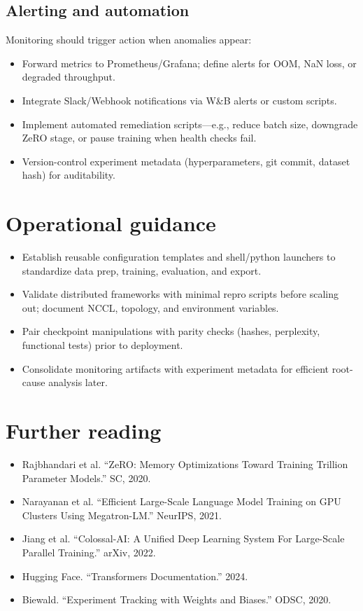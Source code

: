 \documentclass{article}
\begin{document}
\subsection{Alerting and automation}
Monitoring should trigger action when anomalies appear:
\begin{itemize}
  \item Forward metrics to Prometheus/Grafana; define alerts for OOM, NaN loss, or degraded throughput.
  \item Integrate Slack/Webhook notifications via W\&B alerts or custom scripts.
  \item Implement automated remediation scripts—e.g., reduce batch size, downgrade ZeRO stage, or pause training when health checks fail.
  \item Version-control experiment metadata (hyperparameters, git commit, dataset hash) for auditability.
\end{itemize}

\section*{Operational guidance}
\begin{itemize}
  \item Establish reusable configuration templates and shell/python launchers to standardize data prep, training, evaluation, and export.
  \item Validate distributed frameworks with minimal repro scripts before scaling out; document NCCL, topology, and environment variables.
  \item Pair checkpoint manipulations with parity checks (hashes, perplexity, functional tests) prior to deployment.
  \item Consolidate monitoring artifacts with experiment metadata for efficient root-cause analysis later.
\end{itemize}

\section*{Further reading}
\begin{itemize}
  \item Rajbhandari et al. ``ZeRO: Memory Optimizations Toward Training Trillion Parameter Models.'' SC, 2020.
  \item Narayanan et al. ``Efficient Large-Scale Language Model Training on GPU Clusters Using Megatron-LM.'' NeurIPS, 2021.
  \item Jiang et al. ``Colossal-AI: A Unified Deep Learning System For Large-Scale Parallel Training.'' arXiv, 2022.
  \item Hugging Face. ``Transformers Documentation.'' 2024.
  \item Biewald. ``Experiment Tracking with Weights and Biases.'' ODSC, 2020.
\end{itemize}
\end{document}
